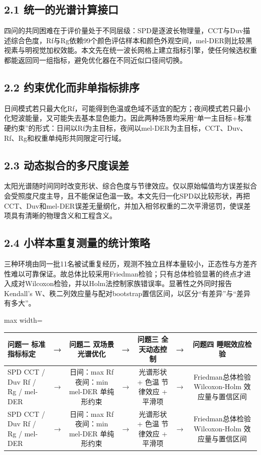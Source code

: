 \documentclass[UTF8,a4paper,12pt]{ctexart}
\begin{document}
\subsection{2.1 统一的光谱计算接口}

四问的共同困难在于评价量处于不同层级：SPD是逐波长物理量，CCT与Duv描述综合色度，Rf与Rg依赖99个颜色评估样本和颜色外观空间，mel-DER则比较黑视素与明视觉加权效能。本文先在统一波长网格上建立指标引擎，使任何候选权重都能返回同一组指标，避免优化器在不同近似口径间切换。

\subsection{2.2 约束优化而非单指标排序}

日间模式若只最大化Rf，可能得到色温或色域不适宜的配方；夜间模式若只最小化短波能量，又可能失去基本显色能力。因此两种场景均采用“单一主目标+标准硬约束”的形式：日间以Rf为主目标，夜间以mel-DER为主目标，CCT、Duv、Rf、Rg和权重单纯形共同限定可行域。

\subsection{2.3 动态拟合的多尺度误差}

太阳光谱随时间同时改变形状、综合色度与节律效应。仅以原始幅值均方误差拟合会受照度尺度主导，且不能保证色温一致。本文先归一化SPD以比较形状，再把CCT、Duv和mel-DER误差无量纲化，并加入相邻权重的二次平滑惩罚，使误差项具有清晰的物理含义和工程含义。

\subsection{2.4 小样本重复测量的统计策略}

三种环境由同一批11名被试重复经历，观测不独立且样本量较小，正态性与方差齐性难以可靠保证。故总体比较采用Friedman检验；只有总体检验显著的终点才进入成对Wilcoxon检验，并以Holm法控制家族错误率。显著性之外同时报告Kendall's W、秩二列效应量与配对bootstrap置信区间，以区分“有差异”与“差异有多大”。

\begin{table}[H]
\centering
\small
\begin{adjustbox}{max width=\textwidth}
\begin{tabular}{lcccccc}
\toprule
问题一 标准指标标定 & → & 问题二 双场景光谱优化 & → & 问题三 全天动态控制 & → & 问题四 睡眠效应检验 \\
\midrule
SPD CCT / Duv Rf / Rg / mel-DER & → & 日间：max Rf 夜间：min mel-DER 单纯形约束 & → & 光谱形状 + 色温 节律效应 + 平滑项 & → & Friedman总体检验 Wilcoxon-Holm 效应量与置信区间 \\
SPD CCT / Duv Rf / Rg / mel-DER & → & 日间：max Rf 夜间：min mel-DER 单纯形约束 & → & 光谱形状 + 色温 节律效应 + 平滑项 & → & Friedman总体检验 Wilcoxon-Holm 效应量与置信区间 \\
\bottomrule
\end{tabular}
\end{adjustbox}
\end{table}
\end{document}
